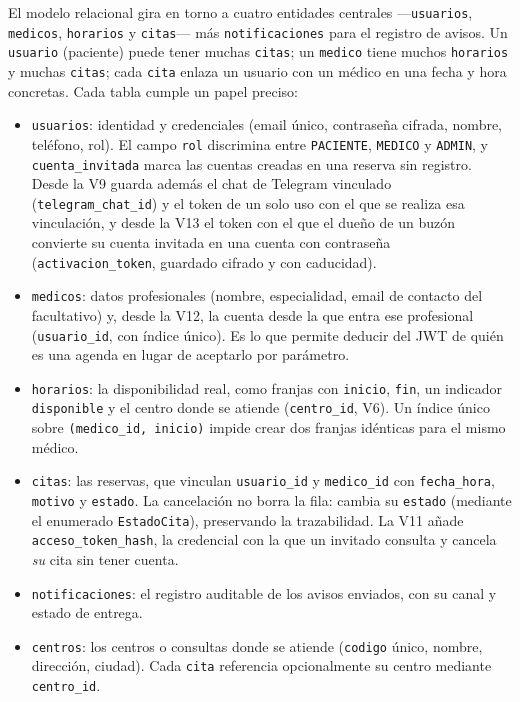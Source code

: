 \documentclass[12pt,a4paper]{report}
\begin{document}


El modelo relacional gira en torno a cuatro entidades centrales —\texttt{usuarios}, \texttt{medicos}, \texttt{horarios} y \texttt{citas}— más \texttt{notificaciones} para el registro de avisos. Un \texttt{usuario} (paciente) puede tener muchas \texttt{citas}; un \texttt{medico} tiene muchos \texttt{horarios} y muchas \texttt{citas}; cada \texttt{cita} enlaza un usuario con un médico en una fecha y hora concretas. Cada tabla cumple un papel preciso:

\begin{itemize}
  \item \texttt{usuarios}: identidad y credenciales (email único, contraseña cifrada, nombre, teléfono, rol). El campo \texttt{rol} discrimina entre \texttt{PACIENTE}, \texttt{MEDICO} y \texttt{ADMIN}, y \texttt{cuenta\_invitada} marca las cuentas creadas en una reserva sin registro. Desde la V9 guarda además el chat de Telegram vinculado (\texttt{telegram\_chat\_id}) y el token de un solo uso con el que se realiza esa vinculación, y desde la V13 el token con el que el dueño de un buzón convierte su cuenta invitada en una cuenta con contraseña (\texttt{activacion\_token}, guardado cifrado y con caducidad).
  \item \texttt{medicos}: datos profesionales (nombre, especialidad, email de contacto del facultativo) y, desde la V12, la cuenta desde la que entra ese profesional (\texttt{usuario\_id}, con índice único). Es lo que permite deducir del JWT de quién es una agenda en lugar de aceptarlo por parámetro.
  \item \texttt{horarios}: la disponibilidad real, como franjas con \texttt{inicio}, \texttt{fin}, un indicador \texttt{disponible} y el centro donde se atiende (\texttt{centro\_id}, V6). Un índice único sobre \texttt{(medico\_id, inicio)} impide crear dos franjas idénticas para el mismo médico.
  \item \texttt{citas}: las reservas, que vinculan \texttt{usuario\_id} y \texttt{medico\_id} con \texttt{fecha\_hora}, \texttt{motivo} y \texttt{estado}. La cancelación no borra la fila: cambia su \texttt{estado} (mediante el enumerado \texttt{EstadoCita}), preservando la trazabilidad. La V11 añade \texttt{acceso\_token\_hash}, la credencial con la que un invitado consulta y cancela \emph{su} cita sin tener cuenta.
  \item \texttt{notificaciones}: el registro auditable de los avisos enviados, con su canal y estado de entrega.
  \item \texttt{centros}: los centros o consultas donde se atiende (\texttt{codigo} único, nombre, dirección, ciudad). Cada \texttt{cita} referencia opcionalmente su centro mediante \texttt{centro\_id}.
\end{itemize}
\end{document}
